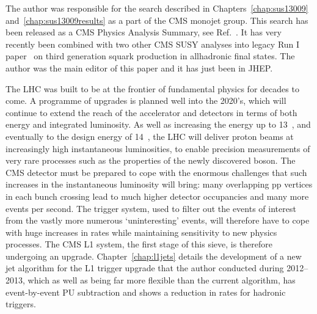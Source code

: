 The author was responsible for the search described in Chapters~\ref{chap:sus13009} and~\ref{chap:sus13009results} as a part of the CMS monojet group.
This search has been released as a CMS Physics Analysis Summary, see Ref.~\cite{sus13009}. 
It has very recently been combined with two other CMS \ac{SUSY} analyses into  legacy Run I paper~\cite{sus14001} on third generation squark production in all\added{-}hadronic final states. 
The author was the main editor of this paper and it has just been  in \ac{JHEP}.




The LHC was built to be at the frontier of fundamental physics for decades to come. 
A programme of upgrades is planned well into the 2020's, which will continue to extend the reach of the accelerator and detectors in terms of both energy and integrated luminosity. 
As well as increasing the energy up to 13~\TeV, and eventually to the design energy of 14~\TeV, the LHC will deliver proton beams at increasingly high instantaneous luminosities, to enable precision measurements of very rare processes such as the properties of the newly discovered boson. 
The CMS detector must be prepared to cope with the enormous challenges that such increases in the instantaneous luminosity will bring: many overlapping pp vertices in each bunch crossing lead to much higher detector occupancies and many more events per second. 
The trigger system, used to filter out the events of interest from the vastly more numerous `uninteresting' events, will therefore have to cope with huge increases in rates while maintaining sensitivity to new physics processes. 
The CMS \ac{L1} system, the first stage of this sieve, is therefore undergoing an upgrade. 
Chapter~\ref{chap:l1jets} details the development of a new jet algorithm for the \ac{L1} trigger upgrade that the author conducted during 2012--2013, which as well as being far more flexible than the current algorithm, has event-by-event \ac{PU} subtraction and shows a reduction in rates for hadronic triggers.





